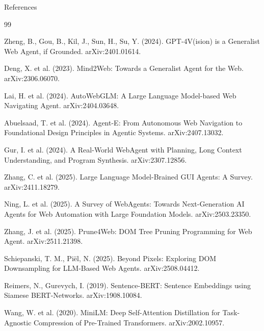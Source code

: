 \begin{frame}[allowframebreaks]{References}
\footnotesize
\begin{thebibliography}{99}

Zheng, B., Gou, B., Kil, J., Sun, H., Su, Y. (2024).
\newblock GPT-4V(ision) is a Generalist Web Agent, if Grounded.
\newblock arXiv:2401.01614.

Deng, X. et al. (2023).
\newblock Mind2Web: Towards a Generalist Agent for the Web.
\newblock arXiv:2306.06070.

Lai, H. et al. (2024).
\newblock AutoWebGLM: A Large Language Model-based Web Navigating Agent.
\newblock arXiv:2404.03648.

Abuelsaad, T. et al. (2024).
\newblock Agent-E: From Autonomous Web Navigation to Foundational Design Principles in Agentic Systems.
\newblock arXiv:2407.13032.

Gur, I. et al. (2024).
\newblock A Real-World WebAgent with Planning, Long Context Understanding, and Program Synthesis.
\newblock arXiv:2307.12856.

Zhang, C. et al. (2025).
\newblock Large Language Model-Brained GUI Agents: A Survey.
\newblock arXiv:2411.18279.

Ning, L. et al. (2025).
\newblock A Survey of WebAgents: Towards Next-Generation AI Agents for Web Automation with Large Foundation Models.
\newblock arXiv:2503.23350.

Zhang, J. et al. (2025).
\newblock Prune4Web: DOM Tree Pruning Programming for Web Agent.
\newblock arXiv:2511.21398.

Schiepanski, T. M., Pi{\"e}l, N. (2025).
\newblock Beyond Pixels: Exploring DOM Downsampling for LLM-Based Web Agents.
\newblock arXiv:2508.04412.

Reimers, N., Gurevych, I. (2019).
\newblock Sentence-BERT: Sentence Embeddings using Siamese BERT-Networks.
\newblock arXiv:1908.10084.

Wang, W. et al. (2020).
\newblock MiniLM: Deep Self-Attention Distillation for Task-Agnostic Compression of Pre-Trained Transformers.
\newblock arXiv:2002.10957.


\end{thebibliography}
\end{frame}
